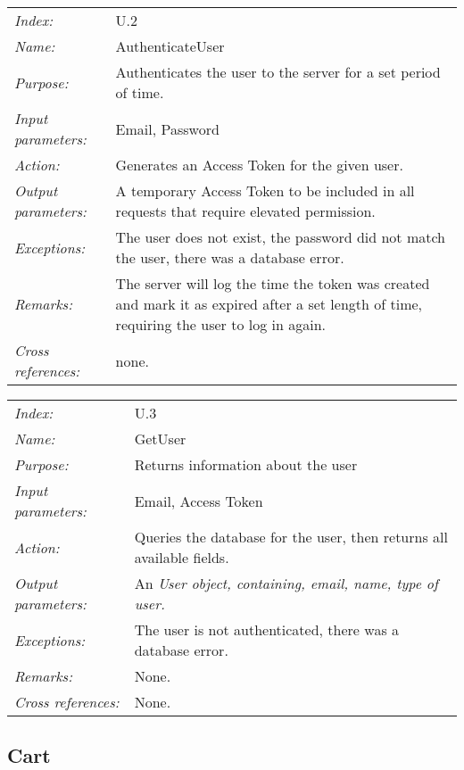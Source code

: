 \documentclass[10pt,letter]{article}
\begin{document}
\begin{tabularx}{\textwidth}{l X}
    \it{Index:} & U.2 \\
    \it{Name:} & AuthenticateUser \\
    \it{Purpose:} & Authenticates the user to the server for a set period of time. \\
    \it{Input parameters:} & Email, Password \\
    \it{Action:} & Generates an Access Token for the given user. \\
    \it{Output parameters:} & A temporary Access Token to be included in all requests that require elevated permission. \\
    \it{Exceptions:} & The user does not exist, the password did not match the user, there was a database error. \\
    \it{Remarks:} & The server will log the time the token was created and mark it as expired after a set length of time, 
    requiring the user to log in again. \\
    \it{Cross references:} & none. \\
    \hline
\end{tabularx}

\begin{tabularx}{\textwidth}{l X}
    \it{Index:} & U.3 \\
    \it{Name:} & GetUser \\
    \it{Purpose:} & Returns information about the user \\
    \it{Input parameters:} & Email, Access Token \\
    \it{Action:} & Queries the database for the user, then returns all available fields. \\
    \it{Output parameters:} &  An \it{User} object, containing, email, name, type of user.\\
    \it{Exceptions:} & The user is not authenticated, there was a database error. \\
    \it{Remarks:} & None. \\
    \it{Cross references:} & None. \\
    \hline
\end{tabularx}

\subsection{Cart}
\end{document}
